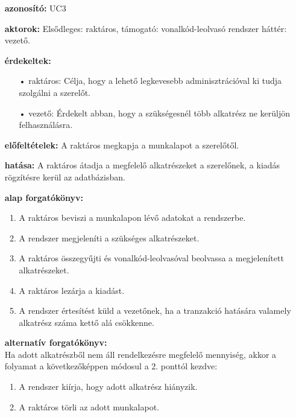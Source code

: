 \documentclass[12pt]{article}\usepackage[left=20mm,right=20mm,top=15mm,bottom=20mm]{geometry}
\begin{document}
\begin{itemize}
\item[] \textbf{azonosító: } UC3
\item[] \textbf{aktorok: } Elsődleges: raktáros, támogató: vonalkód-leolvasó rendszer háttér: vezető.

\item[] \textbf{érdekeltek: }
\vspace*{-3mm}
\begin{itemize}
\item[•] raktáros: Célja, hogy a lehető legkevesebb adminisztrációval ki tudja szolgálni a szerelőt.
\item[•] vezető: Érdekelt abban, hogy a szükségesnél több alkatrész ne kerüljön felhasználásra.
\end{itemize}

\item[] \textbf{előfeltételek: } A raktáros megkapja a munkalapot a szerelőtől.

\item[] \textbf{hatása: } A raktáros átadja a megfelelő alkatrészeket a szerelőnek, a kiadás rögzítésre kerül az adatbázisban.

\item[] \textbf{alap forgatókönyv: }
\begin{enumerate}
\item A raktáros beviszi a munkalapon lévő adatokat a rendszerbe.
\item A rendszer megjeleníti a szükséges alkatrészeket.
\item A raktáros összegyűjti és vonalkód-leolvasóval beolvassa a megjelenített alkatrészeket.
\item A raktáros lezárja a kiadást.
\item A rendszer értesítést küld a vezetőnek, ha a tranzakció hatására valamely alkatrész száma kettő alá csökkenne.
\end{enumerate}

\item[] \textbf{alternatív forgatókönyv:} \\
Ha adott alkatrészből nem áll rendelkezésre megfelelő mennyiség, akkor a folyamat a következőképpen módosul a 2. ponttól kezdve:
\begin{enumerate}
\item A rendszer kiírja, hogy adott alkatrész hiányzik.
\item A raktáros törli az adott munkalapot.
\end{enumerate}
\end{itemize} 
\end{document}
